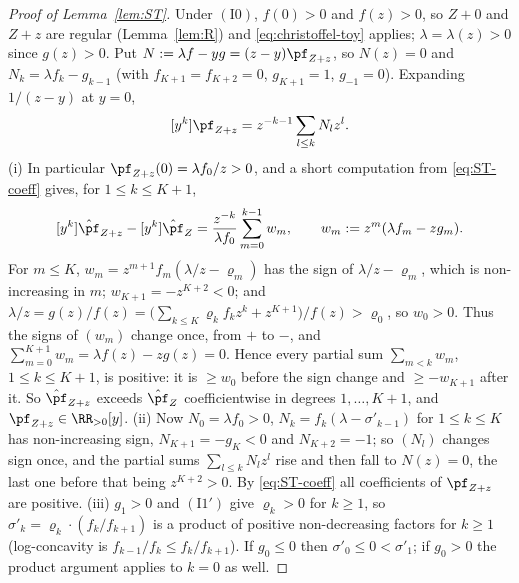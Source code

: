 \begin{proof}[Proof of Lemma~\textup{\ref{lem:ST}}]
Under $(\mathrm{I0})$, $f(0)>0$ and $f(z)>0$, so $Z+0$ and $Z+z$ are regular (Lemma~\ref{lem:R}) and
\eqref{eq:christoffel-toy} applies; $\lambda=\lambda(z)>0$ since $g(z)>0$. Put $N:=\lambda f-yg=(z-y)\pf_{Z+z}$, so
$N(z)=0$ and $N_k=\lambda f_k-g_{k-1}$ (with $f_{K+1}=f_{K+2}=0$, $g_{K+1}=1$, $g_{-1}=0$). Expanding $1/(z-y)$ at $y=0$,
\begin{equation}\label{eq:ST-coeff}
  [y^k]\pf_{Z+z}=z^{-k-1}\sum_{l\le k}N_lz^l .
\end{equation}
(i) In particular $\pf_{Z+z}(0)=\lambda f_0/z>0$, and a short computation from \eqref{eq:ST-coeff} gives, for
$1\le k\le K+1$,
\[
  [y^k]\hat{\pf}_{Z+z}-[y^k]\hat{\pf}_Z=\frac{z^{-k}}{\lambda f_0}\sum_{m=0}^{k-1}w_m,\qquad w_m:=z^m(\lambda f_m-zg_m).
\]
For $m\le K$, $w_m=z^{m+1}f_m(\lambda/z-\varrho_m)$ has the sign of $\lambda/z-\varrho_m$, which is non-increasing
in $m$; $w_{K+1}=-z^{K+2}<0$; and
$\lambda/z=g(z)/f(z)=\bigl(\sum_{k\le K}\varrho_kf_kz^k+z^{K+1}\bigr)/f(z)>\varrho_0$, so $w_0>0$. Thus the signs of
$(w_m)$ change once, from $+$ to $-$, and $\sum_{m=0}^{K+1}w_m=\lambda f(z)-zg(z)=0$. Hence every partial sum
$\sum_{m<k}w_m$, $1\le k\le K+1$, is positive: it is $\ge w_0$ before the sign change and $\ge-w_{K+1}$ after it.
So $\hat{\pf}_{Z+z}$ exceeds $\hat{\pf}_Z$ coefficientwise in degrees $1,\dots,K+1$, and $\pf_{Z+z}\in\RR_{>0}[y]$.
(ii) Now $N_0=\lambda f_0>0$, $N_k=f_k(\lambda-\sigma'_{k-1})$ for $1\le k\le K$ has non-increasing sign,
$N_{K+1}=-g_K<0$ and $N_{K+2}=-1$; so $(N_l)$ changes sign once, and the partial sums $\sum_{l\le k}N_lz^l$ rise and then
fall to $N(z)=0$, the last one before that being $z^{K+2}>0$. By \eqref{eq:ST-coeff} all coefficients of $\pf_{Z+z}$ are
positive. (iii) $g_1>0$ and $(\mathrm{I1}')$ give $\varrho_k>0$ for $k\ge1$, so
$\sigma'_k=\varrho_k\cdot(f_k/f_{k+1})$ is a product of positive non-decreasing factors for $k\ge1$ (log-concavity is
$f_{k-1}/f_k\le f_k/f_{k+1}$). If $g_0\le0$ then $\sigma'_0\le0<\sigma'_1$; if $g_0>0$ the product argument applies to
$k=0$ as well.
\end{proof}

